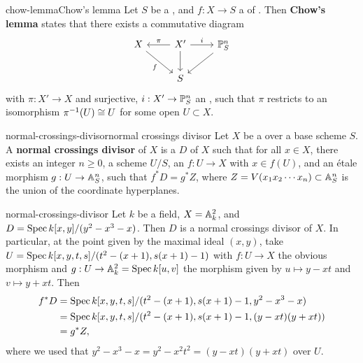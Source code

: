 \begin{topic}{chow-lemma}{Chow's lemma}
    Let $S$ be a  , and $f : X \to S$ a  of . Then \textbf{Chow's lemma} states that there exists a commutative diagram
    \[ \begin{tikzcd}
        X \arrow[swap]{dr}{f} & X' \arrow[swap]{l}{\pi} \arrow{r}{i} \arrow{d} & \PP^n_S \arrow{dl} \\ & S &
    \end{tikzcd} \]
    with $\pi : X' \to X$  and surjective, $i : X' \to \PP^n_S$ an , such that $\pi$ restricts to an isomorphism $\pi^{-1}(U) \isom U$ for some  open $U \subset X$.
 \end{topic}

\begin{topic}{normal-crossings-divisor}{normal crossings divisor}
    Let $X$ be a  over a base scheme $S$. A \textbf{normal crossings divisor} of $X$ is a  $D$ of $X$ such that for all $x \in X$, there exists an integer $n \ge 0$, a scheme $U/S$, an  $f : U \to X$ with $x \in f(U)$, and an étale morphism $g : U \to \AA^n_S$, such that $f^* D = g^* Z$, where $Z = V(x_1 x_2 \cdots x_n) \subset \AA^n_S$ is the union of the coordinate hyperplanes.
\end{topic}

\begin{example}{normal-crossings-divisor}
    Let $k$ be a field, $X = \AA^2_k$, and $D = \Spec k[x, y] / (y^2 - x^3 - x)$. Then $D$ is a normal crossings divisor of $X$. In particular, at the point given by the maximal ideal $(x, y)$, take $U = \Spec k[x, y, t, s] / (t^2 - (x + 1), s (x + 1) - 1)$ with $f : U \to X$ the obvious morphism and $g : U \to \AA^2_k = \Spec k[u, v]$ the morphism given by $u \mapsto y - xt$ and $v \mapsto y + xt$. Then
    \[ \begin{aligned}
        f^* D
            &= \Spec k[x, y, t, s] / (t^2 - (x + 1), s(x + 1) - 1, y^2 - x^3 - x) \\
            &= \Spec k[x, y, t, s] / (t^2 - (x + 1), s(x + 1) - 1, (y - xt)(y + xt)) \\
            &= g^* Z ,
    \end{aligned} \]
    where we used that $y^2 - x^3 - x = y^2 - x^2 t^2 = (y - xt)(y + xt)$ over $U$.
\end{example}


